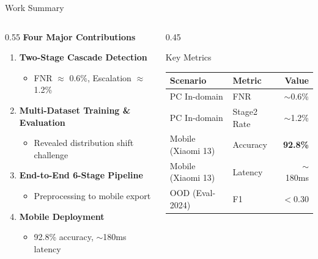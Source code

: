 \documentclass[aspectratio=169,12pt]{beamer}
\newcommand{\highlight}[1]{\textcolor{primaryblue}{\textbf{#1}}}
\begin{document}
\begin{frame}{Work Summary}
\begin{columns}[T]
\begin{column}{0.55\textwidth}
\textbf{Four Major Contributions}

\begin{enumerate}
    \item \highlight{Two-Stage Cascade Detection}
    \begin{itemize}
        \item FNR $\approx$ 0.6\%, Escalation $\approx$ 1.2\%
    \end{itemize}

    \item \highlight{Multi-Dataset Training \& Evaluation}
    \begin{itemize}
        \item Revealed distribution shift challenge
    \end{itemize}

    \item \highlight{End-to-End 6-Stage Pipeline}
    \begin{itemize}
        \item Preprocessing to mobile export
    \end{itemize}

    \item \highlight{Mobile Deployment}
    \begin{itemize}
        \item 92.8\% accuracy, $\sim$180ms latency
    \end{itemize}
\end{enumerate}
\end{column}

\begin{column}{0.45\textwidth}
\begin{block}{Key Metrics}
\begin{center}
\scriptsize
\begin{tabular}{llr}
\toprule
\textbf{Scenario} & \textbf{Metric} & \textbf{Value} \\
\midrule
PC In-domain & FNR & $\sim$0.6\% \\
PC In-domain & Stage2 Rate & $\sim$1.2\% \\
\midrule
Mobile (Xiaomi 13) & Accuracy & \highlight{92.8\%} \\
Mobile (Xiaomi 13) & Latency & $\sim$180ms \\
\midrule
OOD (Eval-2024) & F1 & $<$0.30 \\
\bottomrule
\end{tabular}
\end{center}
\end{block}


\end{column}
\end{columns}
\end{frame}
\end{document}

